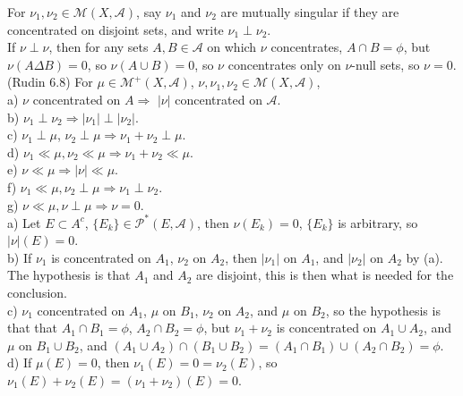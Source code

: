 \documentclass[12pt]{article}
\newcommand{\partset}[1]{ \mathcal{P}^{*}(#1) }
\newcommand{\rimply}[0] { \Rightarrow }
\newcommand{\A}[0] { \mathcal{A} }
\newcommand{\M}[0] { \mathcal{M} }
\begin{document}
For $\nu_1, \nu_2 \in \M(X, \A)$, say $\nu_1$ and $\nu_2$ are mutually singular if they are concentrated on disjoint sets, and write $\nu_1 \perp \nu_2$. \\

\noindent
If $\nu \perp \nu$, then for any sets $A,B \in \A$ on which $\nu$ concentrates, $A \cap B = \phi$, but $\nu(A \Delta B) = 0$, so $\nu(A \cup B) = 0$, so $\nu$ concentrates only on $\nu$-null sets, so $\nu=0$. \\


(Rudin 6.8) For $\mu \in \M^+(X, \A)$, $\nu,\nu_1,\nu_2 \in \M(X, \A)$, \\

\noindent
a) $\nu$ concentrated on $A \rimply$ $|\nu|$ concentrated on $\A$. \\
b) $\nu_1 \perp \nu_2 \rimply |\nu_1| \perp |\nu_2|$. \\
c) $\nu_1 \perp \mu$, $\nu_2 \perp \mu \rimply \nu_1 + \nu_2 \perp \mu$. \\
d) $\nu_1 \ll \mu, \nu_2 \ll \mu \rimply \nu_1 + \nu_2 \ll \mu$. \\
e) $\nu \ll \mu \rimply |\nu| \ll \mu$. \\
f) $\nu_1 \ll \mu, \nu_2 \perp \mu \rimply \nu_1 \perp \nu_2$. \\
g) $\nu \ll \mu, \nu \perp \mu \rimply \nu = 0$. \\

\noindent
a) Let $E \subset A^c$, $\{ E_k \} \in \partset{E, \A}$, then $\nu(E_k) = 0$, $\{E_k\}$ is arbitrary, so $|\nu|(E) = 0$. \\

\noindent
b) If $\nu_1$ is concentrated on $A_1$, $\nu_2$ on $A_2$, then $|\nu_1|$ on $A_1$, and $|\nu_2|$ on $A_2$ by (a). The hypothesis is that $A_1$ and $A_2$ are disjoint, this is then what is needed for the conclusion. \\

\noindent
c) $\nu_1$ concentrated on $A_1$, $\mu$ on $B_1$, $\nu_2$ on $A_2$, and $\mu$ on $B_2$, so the hypothesis is that that $A_1 \cap B_1 = \phi$, $A_2 \cap B_2 = \phi$, but $\nu_1 + \nu_2$ is concentrated on $A_1 \cup A_2$, and $\mu$  on $B_1 \cup B_2$, and $(A_1 \cup A_2) \cap (B_1 \cup B_2) = (A_1 \cap B_1) \cup (A_2 \cap B_2) = \phi$. \\

\noindent
d) If $\mu(E) = 0$, then $\nu_1(E) = 0 = \nu_2(E)$, so $\nu_1(E) + \nu_2(E) = (\nu_1 + \nu_2)(E) = 0$.\\
\end{document}
